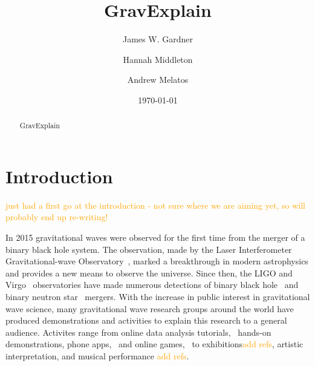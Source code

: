 \documentclass[prb,preprint]{revtex4-1}
\newcommand{\han}{\textcolor{orange}}
\begin{document}
\title{GravExplain}

\author{James W. Gardner}

\author{Hannah Middleton}
\author{Andrew Melatos}

\date{\today}

\begin{abstract}
GravExplain

\end{abstract}

\maketitle

\section{Introduction}
\han{just had a first go at the introduction - not sure where we are aiming yet, so will probably end up re-writing!}

In 2015 gravitational waves were observed for the first time from the merger of a binary black hole system. 
The observation, made by the Laser Interferometer Gravitational-wave Observatory~\citep[LIGO]{AdvancedLIGO:2015}, marked a breakthrough in modern astrophysics and provides a new means to observe the universe. 
Since then, the LIGO and Virgo~\cite{AdvancedVirgo:2015} observatories have made numerous detections of binary black hole~\cite{GW151226,GW170104,GW170814} and binary neutron star~\cite{GW170817,GW170817multi} mergers. 
With the increase in public interest in gravitational wave science, many gravitational wave research groups around the world have produced demonstrations and activities to explain this research to a general audience.
Activites range from online data analysis tutorials,~\cite{GWOSC:Online,LOSC:2015} hands-on demonstrations, phone apps,~\cite{LaserLabs:online,SciVR:online} and online games,~\cite{BlackHoleHunter:online} to exhibitions\han{add refs}, artistic interpretation, and musical performance \han{add refs}. 
\end{document}

